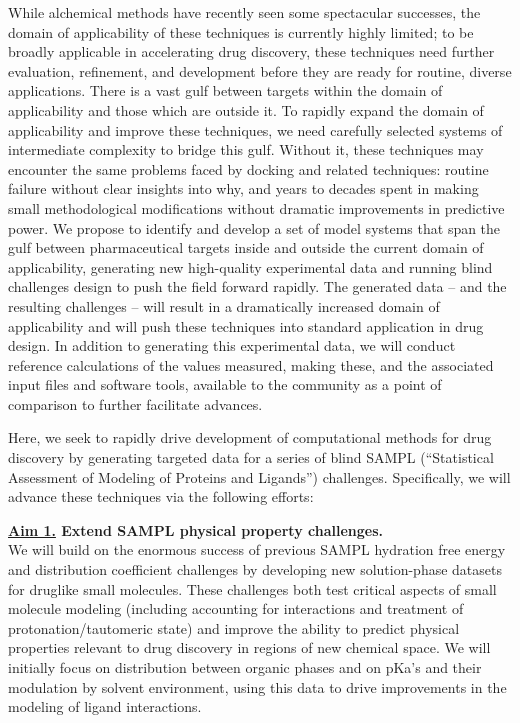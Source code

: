 \documentclass[11pt]{article}
\begin{document}
While alchemical methods have recently seen some spectacular successes, the domain of applicability of these techniques is currently highly limited; to be broadly applicable in accelerating drug discovery, these techniques need further evaluation, refinement, and development before they are ready for routine, diverse applications. 
There is a vast gulf between targets within the domain of applicability and those which are outside it. 
To rapidly expand the domain of applicability and improve these techniques, we need carefully selected systems of intermediate complexity to bridge this gulf. 
Without it, these techniques may encounter the same problems faced by docking and related techniques: routine failure without clear insights into why, and years to decades spent in making small methodological modifications without dramatic improvements in predictive power.
We propose to identify and develop a set of model systems that span the gulf between pharmaceutical targets inside and outside the current domain of applicability, generating new high-quality experimental data and running blind challenges design to push the field forward rapidly.
The generated data -- and the resulting challenges -- will result in a dramatically increased domain of applicability and will push these techniques into standard application in drug design.
In addition to generating this experimental data, we will conduct reference calculations of the values measured, making these, and the associated input files and software tools, available to the community as a point of comparison to further facilitate advances.


Here, we seek to rapidly drive development of computational methods for drug discovery by generating targeted data for a series of blind SAMPL (``Statistical Assessment of Modeling of Proteins and Ligands'') challenges. Specifically, we will advance these techniques via the following efforts:

{\bf \underline{Aim 1.} Extend SAMPL physical property challenges.}\\
We will build on the enormous success of previous SAMPL hydration free energy and distribution coefficient challenges by developing new solution-phase datasets for druglike small molecules. 
These challenges both test critical aspects of small molecule modeling (including accounting for interactions and treatment of protonation/tautomeric state) and improve the ability to predict physical properties relevant to drug discovery in regions of new chemical space. 
We will initially focus on distribution between organic phases and on pKa's and their modulation by solvent environment, using this data to drive improvements in the modeling of ligand interactions.
\end{document}
